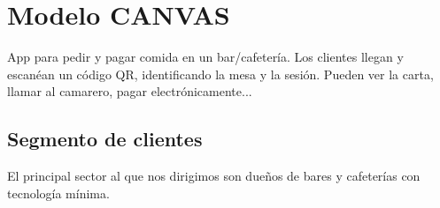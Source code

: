 \section{Modelo CANVAS}




App para pedir y pagar comida en un bar/cafetería. Los clientes llegan y escanéan un código QR, identificando la mesa y la sesión.
Pueden ver la carta, llamar al camarero, pagar electrónicamente...

\subsection{Segmento de clientes}


El principal sector al que nos dirigimos son dueños de bares y cafeterías con tecnología mínima.



